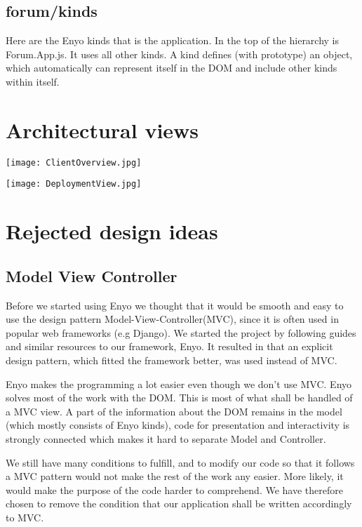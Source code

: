\documentclass[a4paper, 12pt, titlepage]{article}
\begin{document}
    \subsection*{forum/kinds} Here are the Enyo kinds that is the application. In the top of the hierarchy is Forum.App.js. It uses all other kinds. A kind defines (with prototype) an object, which automatically can represent itself in the DOM and include other kinds within itself.

\section{Architectural views}
\cbstart

\begin{center}
	\texttt{[image: ClientOverview.jpg]}
\end{center}

\begin{center}
	\texttt{[image: DeploymentView.jpg]}
\end{center}

\cbend

\section{Rejected design ideas}
\subsection{Model View Controller}
Before we started using Enyo we thought that it would be smooth and easy to use the design pattern Model-View-Controller(MVC), since it is often used in popular web frameworks (e.g Django). We started the project by following guides and similar resources to our framework, Enyo. It resulted in that an explicit design pattern, which fitted the framework better, was used instead of MVC.

Enyo makes the programming a lot easier even though we don't use MVC. Enyo solves most of the work with the DOM. This is most of what shall be handled of a MVC view. A part of the information about the DOM remains in the model (which mostly consists of Enyo kinds), code for presentation and interactivity is strongly connected which makes it hard to separate Model and Controller. 

We still have many conditions to fulfill, and to modify our code so that it follows a MVC pattern would not make the rest of the work any easier. More likely, it would make the purpose of the code harder to comprehend. We have therefore chosen to remove the condition that our application shall be written accordingly to MVC.
\end{document}

